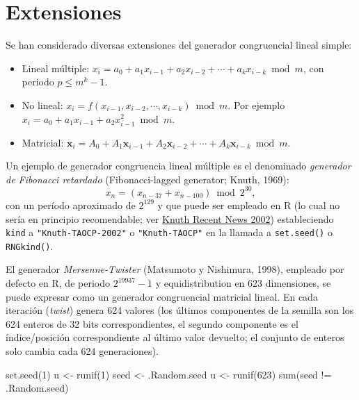 \documentclass[
]{book}
\newenvironment{Shaded}{\begin{snugshade}}{\end{snugshade}}
\newcommand{\DecValTok}[1]{\textcolor[rgb]{0.00,0.00,0.81}{#1}}
\newcommand{\FunctionTok}[1]{\textcolor[rgb]{0.00,0.00,0.00}{#1}}
\newcommand{\NormalTok}[1]{#1}
\newcommand{\OtherTok}[1]{\textcolor[rgb]{0.56,0.35,0.01}{#1}}
\newcommand{\SpecialCharTok}[1]{\textcolor[rgb]{0.00,0.00,0.00}{#1}}
\theoremstyle{break}
\theoremstyle{nonumberplain}
\begin{document}
\hypertarget{ext-cong}{%
\section{Extensiones}\label{ext-cong}}

Se han considerado diversas extensiones del generador congruencial lineal simple:

\begin{itemize}
\item
  Lineal múltiple:
  \(x_{i}= a_0 + a_1 x_{i-1} + a_2 x_{i-2} + \cdots + a_{k} x_{i-k} \bmod m\),
  con periodo \(p\leq m^{k}-1\).
\item
  No lineal:
  \(x_{i} = f\left( x_{i-1}, x_{i-2}, \cdots, x_{i-k} \right) \bmod m\).
  Por ejemplo \(x_{i} = a_0 + a_1 x_{i-1} + a_2 x_{i-1}^2 \bmod m\).
\item
  Matricial:
  \(\boldsymbol{x}_{i} = A_0 + A_1\boldsymbol{x}_{i-1} + A_2\boldsymbol{x}_{i-2} + \cdots + A_{k}\boldsymbol{x}_{i-k} \bmod m\).
\end{itemize}

Un ejemplo de generador congruencia lineal múltiple es el denominado \emph{generador de Fibonacci retardado} (Fibonacci-lagged generator; Knuth, 1969):
\[x_n = (x_{n-37} + x_{n-100}) \bmod 2^{30},\]
con un período aproximado de \(2^{129}\) y que puede ser empleado en R (lo cual no sería en principio recomendable; ver \href{https://www-cs-faculty.stanford.edu/~knuth/news02.html\#rng}{Knuth Recent News 2002}) estableciendo \texttt{kind} a \texttt{"Knuth-TAOCP-2002"} o \texttt{"Knuth-TAOCP"} en la llamada a \texttt{set.seed()} o \texttt{RNGkind()}.

El generador \emph{Mersenne-Twister} (Matsumoto y Nishimura, 1998), empleado por defecto en R, de periodo \(2^{19937}-1\) y equidistribution en 623 dimensiones, se puede expresar como un generador congruencial matricial lineal.
En cada iteración (\emph{twist}) genera 624 valores (los últimos componentes de la semilla son los 624 enteros de 32 bits correspondientes, el segundo componente es el índice/posición correspondiente al último valor devuelto; el conjunto de enteros solo cambia cada 624 generaciones).

\begin{Shaded}
\begin{Highlighting}[]
\FunctionTok{set.seed}\NormalTok{(}\DecValTok{1}\NormalTok{)}
\NormalTok{u }\OtherTok{\textless{}{-}} \FunctionTok{runif}\NormalTok{(}\DecValTok{1}\NormalTok{)}
\NormalTok{seed }\OtherTok{\textless{}{-}}\NormalTok{ .Random.seed}
\NormalTok{u }\OtherTok{\textless{}{-}} \FunctionTok{runif}\NormalTok{(}\DecValTok{623}\NormalTok{)}
\FunctionTok{sum}\NormalTok{(seed }\SpecialCharTok{!=}\NormalTok{ .Random.seed) }
\end{Highlighting}
\end{Shaded}
\end{document}
